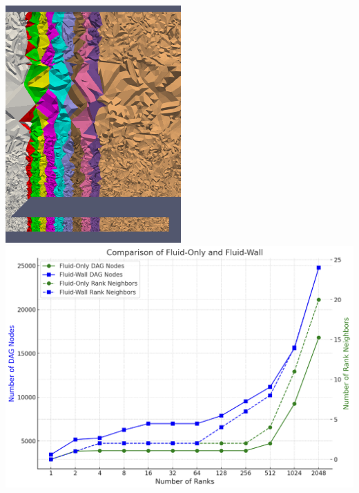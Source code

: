\begin{frame}
\begin{columns}[T]
    \begin{column}{0.5\textwidth}
      \vspace{-15pt}
      \hspace{60pt}
      \includegraphics[width=.4\textwidth]{Figures/mtc/BadPartitioning.png}
      \vfill
      \vspace{10pt}
      \hspace{20pt}
      \includegraphics[width=.7\textwidth]{Figures/mtc/dag_nodes_rank_nbrs.png}
    \end{column}
  \end{columns}
\end{frame}




